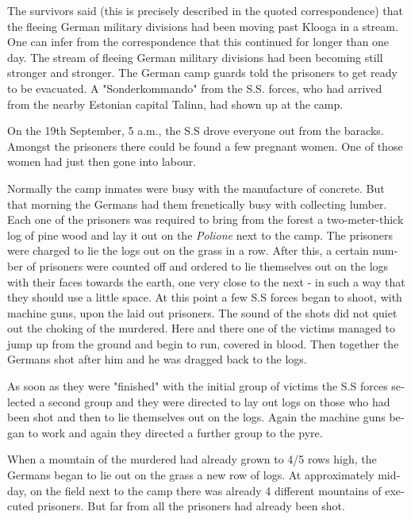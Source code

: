 \documentclass{article}
\begin{document}
\begin{pairs}
\begin{Leftside}
\begin{english}
The survivors said (this is precisely described in the quoted correspondence) that the fleeing German military
divisions had been moving past Klooga in a stream. One can infer from the correspondence that this continued 
for longer than one day. The stream of fleeing German military divisions had been becoming still stronger and
stronger. The German camp guards told the prisoners to get ready to be evacuated. A "Sonderkommando"
from the S.S. forces, who had arrived from the nearby Estonian capital Talinn, had shown up at the camp.

On the 19th September, 5 a.m., the S.S drove everyone out from the baracks. Amongst the prisoners there could be found
a few pregnant women. One of those women had just then gone into labour.

Normally the camp inmates were busy with the manufacture of concrete. But that morning the Germans had them frenetically
busy with collecting lumber. Each one of the prisoners was required to bring from the forest a two-meter-thick log of pine wood and
lay it out on the \emph{Polione} next to the camp. The prisoners were charged to lie the logs out on the grass in a row. After this,
a certain number of prisoners were counted off and ordered to lie themselves out on the logs with their faces towards the earth,
one very close to the next - in such a way that they should use a little space. At this point a few S.S forces began to shoot, with
machine guns, upon the laid out prisoners. The sound of the shots did not quiet out the choking of the murdered. Here and there
one of the victims managed to jump up from the ground and begin to run, covered in blood. Then together the Germans shot after him 
and he was dragged back to the logs. 

As soon as they were "finished" with the initial group of victims
the S.S forces selected a second group and they were directed to lay out logs on those who had been shot and then
to lie themselves out on the logs. Again the machine guns began to work and again they directed a further group to the
pyre.

When a mountain of the murdered had already grown to 4/5 rows high, the Germans began to lie out on the grass
a new row of logs. At approximately midday, on the field next to the camp there was already 4 different mountains
of executed prisoners. But far from all the prisoners had already been shot.


\end{english}
\end{Leftside}
\end{pairs}
\end{document}
